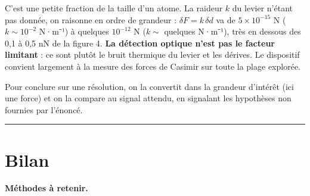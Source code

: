 \documentclass[11pt,a4paper]{article}
\newcommand{\equationajustee}[1]{%
  \sbox{\boiteequation}{$\displaystyle #1$}%
  \ifdim\wd\boiteequation>\linewidth
    \[\resizebox{\linewidth}{!}{\usebox{\boiteequation}}\]%
  \else
    \[#1\]%
  \fi}
\begin{document}
\equationajustee{\boxed{\delta d\approx5\times10^{-13}\ \mathrm m=0{,}5\ \mathrm{pm}}}

C'est une petite fraction de la taille d'un atome. La raideur \(k\) du levier n'étant pas donnée, on raisonne en ordre de grandeur : \(\delta F=k\,\delta d\) va de \(5\times10^{-15}\) N (\(k\sim10^{-2}\) N·m⁻¹) à quelques \(10^{-12}\) N (\(k\sim\) quelques N·m⁻¹), très en dessous des 0,1 à 0,5 nN de la figure 4. \textbf{La détection optique n'est pas le facteur limitant} : ce sont plutôt le bruit thermique du levier et les dérives. Le dispositif convient largement à la mesure des forces de Casimir sur toute la plage explorée.

\begin{methode}

Pour conclure sur une résolution, on la convertit dans la grandeur d'intérêt (ici une force) et on la compare au signal attendu, en signalant les hypothèses non fournies par l'énoncé.

\end{methode}

\begin{center}\rule{0.5\linewidth}{0.5pt}\end{center}

\hypertarget{bilan}{%
\section{Bilan}\label{bilan}}

\textbf{Méthodes à retenir.}
\end{document}
